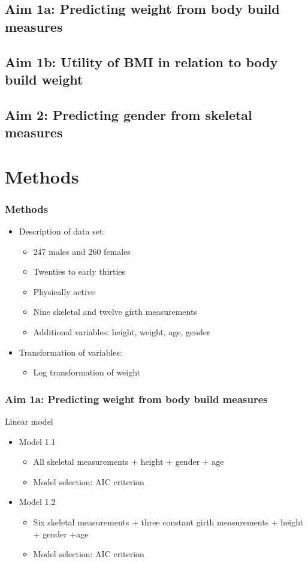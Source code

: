 \documentclass{beamer}
\begin{document}
\subsection{Aim 1a: Predicting weight from body build measures}

\subsection{Aim 1b: Utility of BMI in relation to body build weight}

\subsection{Aim 2: Predicting gender from skeletal measures}

\section{Methods}

\begin{frame}
\frametitle{Methods}

\begin{itemize}
	\item Description of data set:  
		\begin{itemize}
			\item 247 males and 260 females
			\item Twenties to early thirties
			\item Physically active
			\item Nine skeletal and twelve girth measurements
			\item Additional variables: height, weight, age, gender
		\end{itemize}
	\item Transformation of variables:
		\begin{itemize}
			\item Log transformation of weight
		\end{itemize}
\end{itemize}

\end{frame}

\begin{frame}
\frametitle{Aim 1a: Predicting weight from body build measures}

Linear model 
\begin{itemize}
	\item Model 1.1
		\begin{itemize}
			\item All skeletal measurements + height + gender + age
			\item Model selection: AIC criterion
		\end{itemize}
	\item Model 1.2
		\begin{itemize}
			\item Six skeletal measurements + three constant girth measurements + height + gender +age
			\item Model selection: AIC criterion
		\end{itemize}
\end{itemize}

\end{frame}
\end{document}
